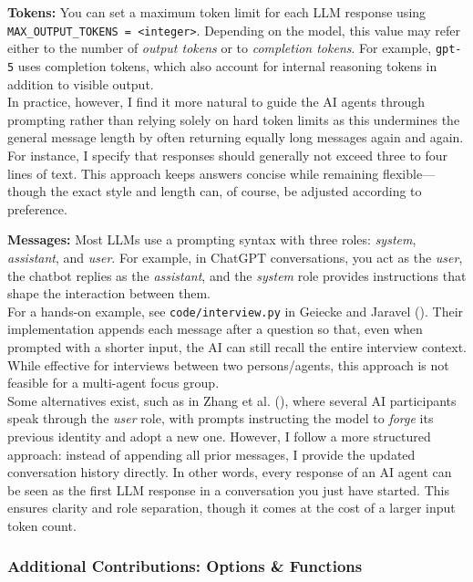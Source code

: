 \documentclass[
  letterpaper,
  DIV=11,
  numbers=noendperiod]{scrartcl}
\begin{document}
\textbf{Tokens:} You can set a maximum token limit for each LLM response
using \texttt{MAX\_OUTPUT\_TOKENS\ =\ \textless{}integer\textgreater{}}.
Depending on the model, this value may refer either to the number of
\emph{output tokens} or to \emph{completion tokens}. For example,
\texttt{gpt-5} uses completion tokens, which also account for internal
reasoning tokens in addition to visible output.\\
In practice, however, I find it more natural to guide the AI agents
through prompting rather than relying solely on hard token limits as
this undermines the general message length by often returning equally
long messages again and again. For instance, I specify that responses
should generally not exceed three to four lines of text. This approach
keeps answers concise while remaining flexible---though the exact style
and length can, of course, be adjusted according to preference.

\textbf{Messages:} Most LLMs use a prompting syntax with three roles:
\emph{system}, \emph{assistant}, and \emph{user}. For example, in
ChatGPT conversations, you act as the \emph{user}, the chatbot replies
as the \emph{assistant}, and the \emph{system} role provides
instructions that shape the interaction between them.\\
For a hands-on example, see \texttt{code/interview.py} in Geiecke and
Jaravel (). Their
implementation appends each message after a question so that, even when
prompted with a shorter input, the AI can still recall the entire
interview context. While effective for interviews between two
persons/agents, this approach is not feasible for a multi-agent focus
group.\\
Some alternatives exist, such as in Zhang et al.
(), where several AI
participants speak through the \emph{user} role, with prompts
instructing the model to \emph{forge} its previous identity and adopt a
new one. However, I follow a more structured approach: instead of
appending all prior messages, I provide the updated conversation history
directly. In other words, every response of an AI agent can be seen as
the first LLM response in a conversation you just have started. This
ensures clarity and role separation, though it comes at the cost of a
larger input token count.

\subsubsection{Additional Contributions: Options \&
Functions}\label{sec-focusgroup-options}
\end{document}
